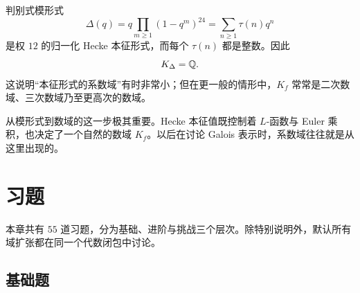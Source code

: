 \begin{example}
判别式模形式
\[
\Delta(q)=q\prod_{m\ge1}(1-q^m)^{24}=\sum_{n\ge1}\tau(n)q^n
\]
是权 $12$ 的归一化 Hecke 本征形式，而每个 $\tau(n)$ 都是整数。因此
\[
K_\Delta=\mathbb{Q}.
\]
这说明“本征形式的系数域”有时非常小；但在更一般的情形中，$K_f$ 常常是二次数域、三次数域乃至更高次的数域。
\end{example}

\begin{remark}
从模形式到数域的这一步极其重要。Hecke 本征值既控制着 $L$-函数与 Euler 乘积，也决定了一个自然的数域 $K_f$。以后在讨论 Galois 表示时，系数域往往就是从这里出现的。
\end{remark}

\section*{习题}

本章共有 $55$ 道习题，分为基础、进阶与挑战三个层次。除特别说明外，默认所有域扩张都在同一个代数闭包中讨论。

\subsection*{基础题}

